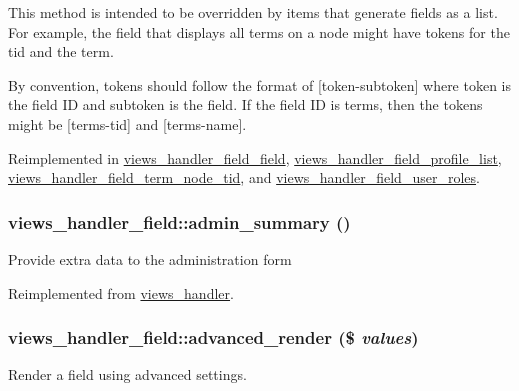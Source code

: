 This method is intended to be overridden by items that generate fields as a list. For example, the field that displays all terms on a node might have tokens for the tid and the term.

By convention, tokens should follow the format of \mbox{[}token-\/subtoken\mbox{]} where token is the field ID and subtoken is the field. If the field ID is terms, then the tokens might be \mbox{[}terms-\/tid\mbox{]} and \mbox{[}terms-\/name\mbox{]}. 

Reimplemented in \hyperlink{classviews__handler__field__field_a188044611e725e210d9b538b5b91f0c9}{views\_\-handler\_\-field\_\-field}, \hyperlink{classviews__handler__field__profile__list_a411c5238debac02e7cb3f582f7cd8e9f}{views\_\-handler\_\-field\_\-profile\_\-list}, \hyperlink{classviews__handler__field__term__node__tid_a7fea3443ab075e3e35212ddc3b0d95f3}{views\_\-handler\_\-field\_\-term\_\-node\_\-tid}, and \hyperlink{classviews__handler__field__user__roles_aceb9ebe1ca046eec3634c85bb6b114f5}{views\_\-handler\_\-field\_\-user\_\-roles}.\hypertarget{classviews__handler__field_a984d6ce9f6401260fca2d4673b27ae76}{
\subsubsection[{admin\_\-summary}]{\setlength{\rightskip}{0pt plus 5cm}views\_\-handler\_\-field::admin\_\-summary ()}}
\label{classviews__handler__field_a984d6ce9f6401260fca2d4673b27ae76}
Provide extra data to the administration form 

Reimplemented from \hyperlink{classviews__handler_a27a5cb35f3f17322957730a95b6be11e}{views\_\-handler}.\hypertarget{classviews__handler__field_aeaf2c6f1ad7afa813ba64de4be3ecd58}{
\subsubsection[{advanced\_\-render}]{\setlength{\rightskip}{0pt plus 5cm}views\_\-handler\_\-field::advanced\_\-render (\$ {\em values})}}
\label{classviews__handler__field_aeaf2c6f1ad7afa813ba64de4be3ecd58}
Render a field using advanced settings.

